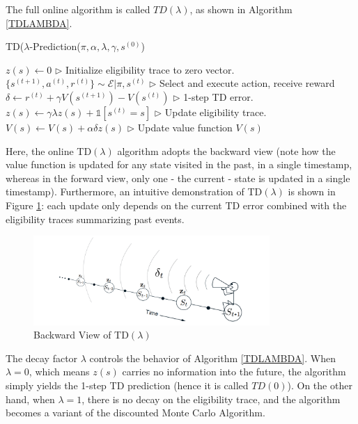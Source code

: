 \documentclass[11pt]{article}
\begin{document}
The full online algorithm is called $TD(\lambda)$, as shown in Algorithm \ref{TDLAMBDA}.

\begin{algorithm}[H]
\caption{TD($\lambda$-Prediction($\pi,\alpha,\lambda,\gamma,s^{(0)}$)}
\begin{algorithmic}
\label{TDLAMBDA}
\STATE $z(s)\leftarrow 0$ \hfill $\triangleright$ Initialize eligibility trace to zero vector.
\ENDFOR
{}
\STATE $\{s^{(t+1)},a^{(t)},r^{(t)}\}\sim \mathcal{E}|\pi,s^{(t)}$ \hfill $\triangleright$ Select and execute action, receive reward
\STATE $\delta\leftarrow r^{(t)}+\gamma V\left(s^{(t+1)}\right)-V\left(s^{(t)}\right)$ \hfill$\triangleright$ 1-step TD error.
\STATE $z(s)\leftarrow \gamma\lambda z(s)+\mathds{1}\left[s^{(t)}=s\right]$ \hfill $\triangleright$ Update eligibility trace.
\STATE $V(s)\leftarrow V(s)+\alpha\delta z(s)$ \hfill $\triangleright$ Update value function
\ENDFOR
\ENDFOR
\RETURN $V(s)$
\end{algorithmic}
\end{algorithm}

Here, the online TD$(\lambda)$ algorithm adopts the backward view (note how the value function is updated for any state visited in the past, in a single timestamp, whereas in the forward view, only one - the current - state is updated in a single timestamp). Furthermore, an intuitive demonstration of TD$(\lambda)$ is shown in Figure \ref{fig:backward}: each update only depends on the current TD error combined with the eligibility traces summarizing past events.

\begin{figure}[ht]
    \centering
    \includegraphics[width=0.8\textwidth]{backward.PNG}
    \caption{Backward View of TD$(\lambda)$ \cite{sutton_reinforcement_1998}}
    \label{fig:backward}
\end{figure}

The decay factor $\lambda$ controls the behavior of Algorithm \ref{TDLAMBDA}. When $\lambda=0$, which means $z(s)$ carries no information into the future, the algorithm simply yields the 1-step TD prediction (hence it is called $TD(0)$). On the other hand, when $\lambda=1$, there is no decay on the eligibility trace, and the algorithm becomes a variant of the discounted Monte Carlo Algorithm.
\end{document}

